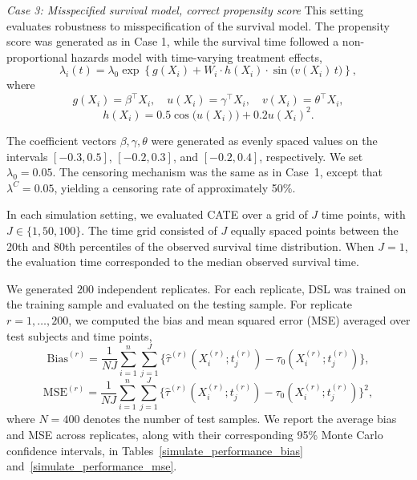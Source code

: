 \documentclass{article}
\begin{document}
\textit{Case 3: Misspecified survival model, correct propensity score} This setting evaluates robustness to misspecification of the survival model. The propensity score was generated as in Case 1, while the survival time followed a non-proportional hazards model with time-varying treatment effects,
\[
\lambda_i(t) = \lambda_0
\exp\left\{
g(X_i)
+ W_i \cdot h(X_i)\cdot \sin\!\big(v(X_i)\, t\big)
\right\},
\]
where
\[
g(X_i) = \beta^{\top}X_i,\quad
u(X_i) = \gamma^{\top}X_i,\quad
v(X_i) = \theta^{\top}X_i,
\]
\[
h(X_i)
= 0.5\cos\big(u(X_i)\big)
+ 0.2u(X_i)^2.
\]

The coefficient vectors $\beta, \gamma, \theta$ were generated as evenly spaced values on the intervals
$[-0.3,0.5]$, $[-0.2,0.3]$, and $[-0.2,0.4]$, respectively. We set $\lambda_0 = 0.05$.
The censoring mechanism was the same as in Case~1, except that $\lambda^C = 0.05$, yielding a censoring rate of approximately 50\%.

In each simulation setting, we evaluated CATE over a grid of $J$ time points, with
\(
J \in \{1, 50, 100\}.
\)
The time grid consisted of $J$ equally spaced points between the 20th and 80th percentiles of the observed survival time distribution. When $J=1$, the evaluation time corresponded to the median observed survival time.

We generated $200$ independent replicates. For each replicate, DSL was trained on the training sample and evaluated on the testing sample. For replicate $r=1, \ldots, 200$, we computed the bias and mean squared error (MSE) averaged over test subjects and time points,
\[
\mathrm{Bias}^{(r)}
=
\frac{1}{NJ}\sum_{i=1}^n\sum_{j=1}^J
\Big\{
\hat\tau^{(r)}(X_i^{(r)};t_j^{(r)})
-
\tau_0(X_i^{(r)};t_j^{(r)})
\Big\},
\]
\[
\mathrm{MSE}^{(r)}
=
\frac{1}{NJ}\sum_{i=1}^n\sum_{j=1}^J
\Big\{
\hat\tau^{(r)}(X_i^{(r)};t_j^{(r)})
-
\tau_0(X_i^{(r)};t_j^{(r)})
\Big\}^2,
\]
where $N = 400$ denotes the number of test samples. We report the average bias and MSE across replicates,
 along with their corresponding 95\% Monte Carlo confidence intervals, in
Tables~\ref{simulate_performance_bias} and~\ref{simulate_performance_mse}.
\end{document}
